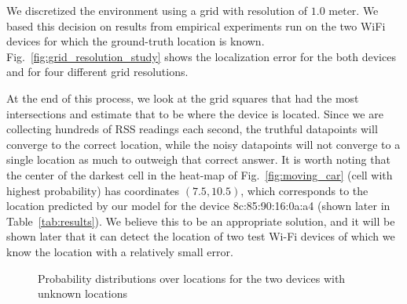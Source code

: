 \documentclass{article}
\begin{document}
We discretized the environment using a grid with resolution of $1.0$ meter. We based this decision 
on results from empirical experiments run on the two WiFi devices for which the ground-truth location 
is known. Fig.~\ref{fig:grid_resolution_study} shows the localization error for the both devices and 
for four different grid resolutions.

At the end of this process, we look at the grid squares that had the most
intersections and estimate that to be where the device is located.
Since we are collecting hundreds of RSS readings each second, the truthful 
datapoints will converge to the correct location, while the noisy datapoints will not converge to 
a single location as much to outweigh that correct answer. 
It is worth noting that the center of the darkest cell in the heat-map of Fig.~\ref{fig:moving_car}
(cell with highest probability) has coordinates $(7.5, 10.5)$, which corresponds to the location 
predicted by our model for the device 8c:85:90:16:0a:a4 (shown later in Table~\ref{tab:results}).
We believe this to be an appropriate 
solution, and it will be shown later that it can detect the location of two test Wi-Fi devices of 
which we know the location with a relatively small error.




\begin{figure}[t]
    \centering
    \qquad
    \caption{Probability distributions over locations for the two devices with unknown locations}%
    \label{fig:pdists_hidden_cameras}%
\end{figure}
\end{document}
